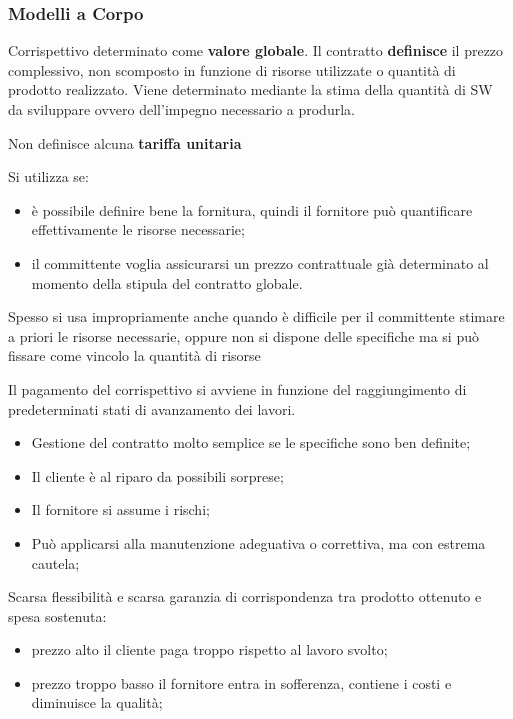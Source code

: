 \documentclass{article}
\begin{document}
\subsubsection{Modelli a Corpo}\label{sub:modelli_a_corpo} %
Corrispettivo determinato come \textbf{valore globale}.
Il contratto \textbf{definisce} il prezzo complessivo, non scomposto in funzione di risorse utilizzate o quantità di prodotto realizzato.
Viene determinato mediante la stima della quantità di SW da sviluppare ovvero dell'impegno necessario a produrla.
\begin{warning}
    Non definisce alcuna \textbf{tariffa unitaria}
\end{warning}
Si utilizza se:
\begin{itemize}
    \item è possibile definire bene la fornitura, quindi il fornitore può quantificare effettivamente le risorse necessarie;
    \item il committente voglia assicurarsi un prezzo contrattuale già determinato al momento della stipula del contratto globale.
\end{itemize}
\begin{note}
    Spesso si usa impropriamente anche quando è difficile per il committente stimare a priori le risorse necessarie, oppure non si dispone delle specifiche ma si può fissare come vincolo la quantità di risorse
\end{note}
Il pagamento del corrispettivo si avviene in funzione del raggiungimento di predeterminati stati di avanzamento dei lavori.
\begin{note}[Vantaggi]
    \begin{itemize}
        \item Gestione del contratto molto semplice se le specifiche sono ben definite;
        \item Il cliente è al riparo da possibili sorprese;
        \item Il fornitore si assume i rischi;
        \item Può applicarsi alla manutenzione adeguativa o correttiva, ma con estrema cautela;
    \end{itemize}
\end{note}
\begin{warning}[Svantaggi]
    Scarsa flessibilità e scarsa garanzia di corrispondenza tra prodotto ottenuto e spesa sostenuta:
    \begin{itemize}
        \item prezzo alto il cliente paga troppo rispetto al lavoro svolto;
        \item prezzo troppo basso il fornitore entra in sofferenza, contiene i costi e diminuisce la qualità;
    \end{itemize}
\end{warning}
\end{document}
